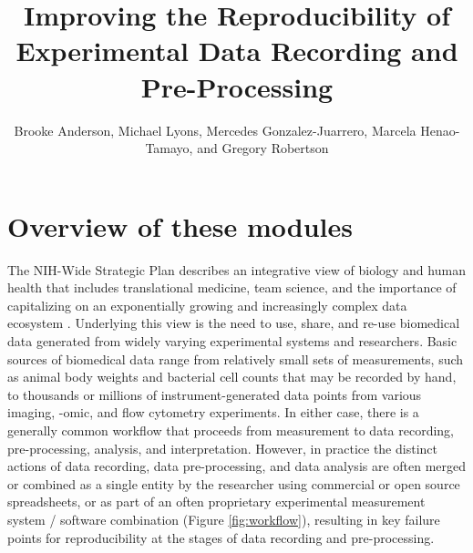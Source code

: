 \documentclass[]{tufte-book}
\title{Improving the Reproducibility of Experimental Data Recording and Pre-Processing}
\author{Brooke Anderson, Michael Lyons, Mercedes Gonzalez-Juarrero, Marcela Henao-Tamayo, and Gregory Robertson}
\date{}
\begin{document}
\maketitle



{
\setcounter{tocdepth}{1}
\tableofcontents
}

\chapter{Overview of these modules}\label{overview-of-these-modules}

The NIH-Wide Strategic Plan \citep{nih2016strategic}
describes an integrative view of biology and human health that includes
translational medicine, team science, and the importance of capitalizing on an
exponentially growing and increasingly complex data ecosystem \citep{nih2018data}.
Underlying this view is the need to use, share, and re-use biomedical data
generated from widely varying experimental systems and researchers. Basic
sources of biomedical data range from relatively small sets of measurements,
such as animal body weights and bacterial cell counts that may be recorded by
hand, to thousands or millions of instrument-generated data points from various
imaging, -omic, and flow cytometry experiments. In either case, there is a
generally common workflow that proceeds from measurement to data recording,
pre-processing, analysis, and interpretation. However, in practice the distinct
actions of data recording, data pre-processing, and data analysis are often
merged or combined as a single entity by the researcher using commercial or open
source spreadsheets, or as part of an often proprietary experimental measurement
system / software combination (Figure \ref{fig:workflow}), resulting in key
failure points for reproducibility at the stages of data recording and
pre-processing.
\end{document}
